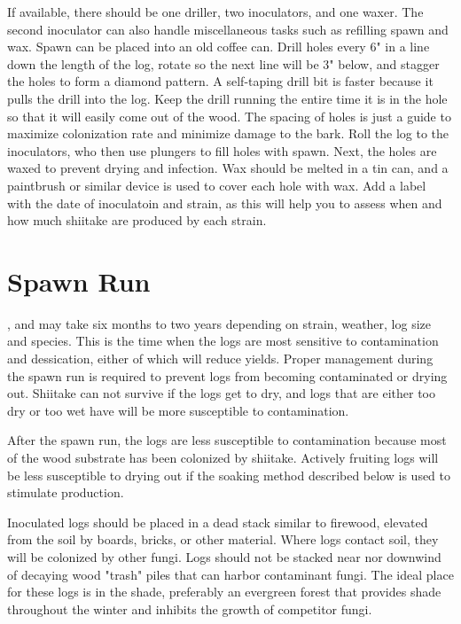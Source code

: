 \documentclass{tufte-handout}
\begin{document}
If available, there should be one driller, two inoculators, and one waxer.
The second inoculator can also handle miscellaneous tasks such as refilling spawn and wax.
Spawn can be placed into an old coffee can. 
Drill holes every 6" in a line down the length of the log, rotate so the next line will be 3" below, and stagger the holes to form a diamond pattern. 
A self-taping drill bit is faster because it pulls the drill into the log.
Keep the drill running the entire time it is in the hole so that it will easily come out of the wood. 
The spacing of holes is just a guide to maximize colonization rate
and minimize damage to the bark. 
Roll the log to the inoculators, who then use plungers to fill holes with spawn.
Next, the holes are waxed to prevent
drying and infection. 
Wax should be melted in a tin can, and a paintbrush or similar device is used to cover each hole with wax.
Add a label with the date of inoculatoin and strain, as this will help you to assess
when and how much shiitake are produced
by each strain.

\section{Spawn Run}

, and may take six months to two years depending on strain, weather, log size and species.
This is the time when the logs are most sensitive to contamination and dessication,  either of which will reduce yields.
Proper management during the spawn run is required to prevent logs from becoming contaminated or drying out.
Shiitake can not survive if the logs get to dry, and logs that are either too dry or too wet have will be more susceptible to contamination.

After the spawn run, the logs are less susceptible to contamination because most of the wood substrate has been colonized by shiitake. 
Actively fruiting logs will be less susceptible to drying out if the soaking method described below is used to stimulate production. 

Inoculated logs should be placed in a dead stack similar to firewood, elevated from the soil by boards, bricks, or other material. 
Where logs contact soil, they will be colonized by other fungi. 
Logs should not be stacked near nor downwind of decaying wood "trash" piles that can harbor contaminant fungi.
The ideal place for these logs is in the shade, preferably an evergreen forest that provides shade throughout the winter and inhibits the growth of competitor fungi.
\end{document}
